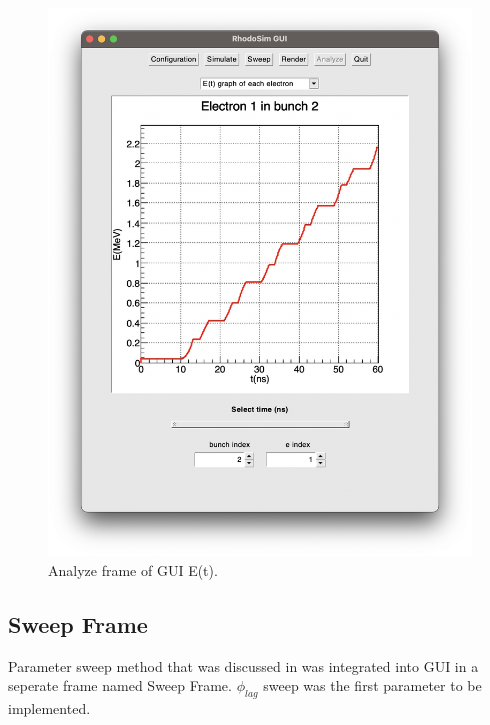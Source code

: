 \documentclass[a4paper,oneside,12pt]{report}
\numberwithin{equation}{chapter}
\begin{document}
{\begin{figure}[h!]
    \centering
    \includegraphics[width=0.9\linewidth]{./figures/rhodoSim/GUI_analyze_Et_3.png}
    \vspace{-20pt}
    \caption{Analyze frame of GUI E(t).}
    \label{fig:gui_analyze_Et}
    \vspace{20pt}
\end{figure}

\subsection{Sweep Frame}
Parameter sweep method that was discussed in  was integrated into GUI in a seperate frame named Sweep Frame.
$\phi_{lag}$ sweep was the first parameter to be implemented. 

}
\end{document}
